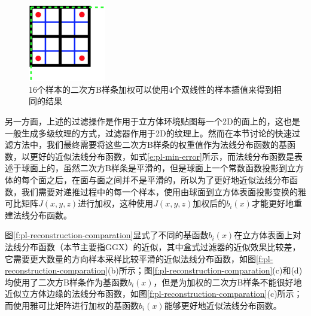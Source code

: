 \begin{figure}
	\sidecaption
	\includegraphics[width=0.3\textwidth]{figures/pl/downsampling}
	\caption{16个样本的二次方B样条加权可以使用4个双线性的样本插值来得到相同的结果}
	\label{f:pl-downsampling}
\end{figure}

另一方面，上述的过滤操作是作用于立方体环境贴图每一个2D的面上的，这也是一般生成多级纹理的方式，过滤器作用于2D的纹理上。然而在本节讨论的快速过滤方法中，我们最终需要将这些二次方B样条的权重值作为法线分布函数的基函数，以更好的近似法线分布函数，如式\ref{e:pl-min-error}所示，而法线分布函数是表述于球面上的，虽然二次方B样条是平滑的，但是球面上一个常数函数投影到立方体的每个面之后，在面与面之间并不是平滑的，所以为了更好地近似法线分布函数，我们需要对递推过程中的每一个样本，使用由球面到立方体表面投影变换的雅可比矩阵$J(x,y,z)$进行加权，这种使用$J(x,y,z)$加权后的$b_i(x)$才能更好地重建法线分布函数。

图\ref{f:pl-reconstruction-comparation}显式了不同的基函数$b_i(x)$在立方体表面上对法线分布函数（本节主要指GGX）的近似，其中盒式过滤器的近似效果比较差，它需要更大数量的方向样本采样比较平滑的近似法线分布函数，如图\ref{f:pl-reconstruction-comparation}(b)所示；图\ref{f:pl-reconstruction-comparation}(c)和(d)均使用了二次方B样条作为基函数$b_i(x)$，但是为加权的二次方B样条不能很好地近似立方体边缘的法线分布函数，如图\ref{f:pl-reconstruction-comparation}(c)所示；而使用雅可比矩阵进行加权的基函数$b_i(x)$能够更好地近似法线分布函数。

